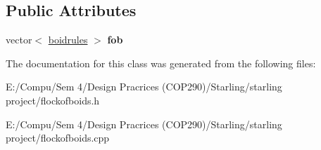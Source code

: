 \subsection*{Public Attributes}
\begin{DoxyCompactItemize}
\item 
\mbox{\label{classflockofboids_a09095e4a651471b7b127a5e151c2a209}} 
vector$<$ \mbox{\hyperlink{classboidrules}{boidrules}} $>$ {\bfseries fob}
\end{DoxyCompactItemize}


The documentation for this class was generated from the following files\+:\begin{DoxyCompactItemize}
\item 
E\+:/\+Compu/\+Sem 4/\+Design Pracrices (\+C\+O\+P290)/\+Starling/starling project/flockofboids.\+h\item 
E\+:/\+Compu/\+Sem 4/\+Design Pracrices (\+C\+O\+P290)/\+Starling/starling project/flockofboids.\+cpp\end{DoxyCompactItemize}
